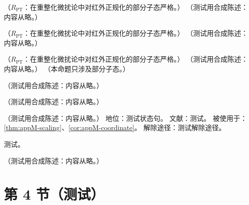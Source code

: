 \begin{lemma}\label{lem:appM-integrability}
（$R_{\mathrm{PT}}$：在重整化微扰论中对红外正规化的部分子态严格。）
（测试用合成陈述：内容从略。）
\end{lemma}

\begin{lemma}\label{lem:appM-contact}
（$R_{\mathrm{PT}}$：在重整化微扰论中对红外正规化的部分子态严格。）
（测试用合成陈述：内容从略。）
\end{lemma}

\begin{theorem}\label{thm:appM-ope-identity}
（$R_{\mathrm{PT}}$：在重整化微扰论中对红外正规化的部分子态严格。）
（测试用合成陈述：内容从略。）
（本命题只涉及部分子态。）
\end{theorem}

\begin{example}\label{ex:appM-tree}
（测试用合成陈述：内容从略。）
\end{example}

\begin{remark}[指数 $D-1-a$ 的启发式来源]\label{rem:appM-mechanism}
（测试用合成陈述：内容从略。）
\end{remark}

\begin{assumption}\label{asm:appM-remainder}
（测试用合成陈述：内容从略。）
地位：测试状态句。
文献：测试。
被使用于：\cref{thm:appM-scaling}、\cref{cor:appM-coordinate}。
解除途径：测试解除途径。
\end{assumption}
\begin{proofsketch}测试。\end{proofsketch}

\begin{lemma}\label{lem:appM-derivative-bounds}
（测试用合成陈述：内容从略。）
\end{lemma}

\section{第 4 节（测试）}\label{sec:appM-remainder}

